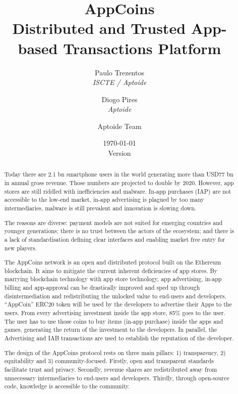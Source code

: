 \documentclass[12pt, a4paper, titlepage]{article}
\title{AppCoins\\ Distributed and Trusted App-based Transactions Platform}
\author{\small Paulo Trezentos  \\
  {\em  ISCTE / Aptoide}  \\
  \and 
\small  Diogo Pires \\
  {\em Aptoide} \\
  \and
  Aptoide Team
  }
\date{\today\\\normalsize Version \versionnumber}
\begin{document}
\maketitle


\begin{abstract}

Today there are 2.1 bn smartphone users in the world generating more than USD77 bn in annual gross revenue. Those numbers are projected to double by 2020. However, app stores are still riddled with inefficiencies and malware. In-app purchases (IAP) are not accessible to the low-end market, in-app advertising is plagued by too many intermediaries, malware is still prevalent and innovation is slowing down.

\medskip

The reasons are diverse: payment models are not suited for emerging countries and younger generations; there is no trust between the actors of the ecosystem; and there is a lack of standardisation defining clear interfaces and enabling market free entry for new players.

\medskip

The AppCoins network is an open and distributed protocol built on the Ethereum blockchain. It aims to mitigate the current inherent deficiencies of app stores. By marrying blockchain technology with app store technology, app advertising, in-app billing and app-approval can be drastically improved and sped up through disintermediation and redistributing the unlocked value to end-users and developers. ``AppCoin'' ERC20 token will be used by the developers to advertise their Apps to the users. From every advertising investment inside the app store, 85\% goes to the user. The user has to use those coins to buy items (in-app purchase) inside the apps and games, generating the return of the investment to the developers. In parallel, the Advertising and IAB transactions are used to establish the reputation of the developer.

\medskip

The design of the AppCoins protocol rests on three main pillars: 1) transparency, 2) equitability and 3) community-focused. Firstly, open and transparent standards facilitate trust and privacy. Secondly, revenue shares are redistributed away from unnecessary intermediaries to end-users and developers. Thirdly, through open-source code, knowledge is accessible to the community. 


\end{abstract}
\end{document}
